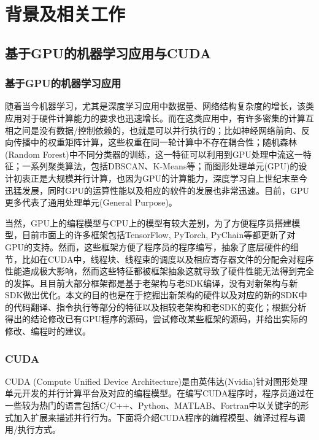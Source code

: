 \section{背景及相关工作}

\subsection{基于GPU的机器学习应用与CUDA}

\subsubsection{基于GPU的机器学习应用}
\par 随着当今机器学习，尤其是深度学习应用中数据量、网络结构复杂度的增长，该类应用对于硬件计算能力的要求也迅速增长。而在这类应用中，有许多密集的计算互相之间是没有数据/控制依赖的，也就是可以并行执行的；比如神经网络前向、反向传播中的权重矩阵计算，这些权重在同一轮计算中不存在耦合性；随机森林(Random Forest)中不同分类器的训练，这一特征可以利用到GPU处理中流这一特征；一系列聚类算法，包括DBSCAN、K-Means等；而图形处理单元(GPU)的设计初衷正是大规模并行计算，也因为GPU的计算能力，深度学习自上世纪末至今迅猛发展，同时GPU的运算性能以及相应的软件的发展也非常迅速。目前，GPU更多代表了通用处理单元(General Purpose)。
\par 当然，GPU上的编程模型与CPU上的模型有较大差别，为了方便程序员搭建模型，目前市面上的许多框架包括TensorFlow, PyTorch, PyChain等都更新了对GPU的支持。然而，这些框架方便了程序员的程序编写，抽象了底层硬件的细节，比如在CUDA中，线程块、线程束的调度以及相应寄存器文件的分配会对程序性能造成极大影响，然而这些特征都被框架抽象这就导致了硬件性能无法得到完全的发挥。且目前大部分框架都是基于老架构与老SDK编译，没有对新架构与新SDK做出优化。本文的目的也是在于挖掘出新架构的硬件以及对应的新的SDK中的代码翻译、指令执行等部分的特征以及相较老架构和老SDK的变化；根据分析得出的结论修改已有GPU程序的源码，尝试修改某些框架的源码，并给出实际的修改、编程时的建议。
\subsubsection{CUDA}
\par CUDA (Compute Unified Device Architecture)是由英伟达(Nvidia)针对图形处理单元开发的并行计算平台及对应的编程模型。在编写CUDA程序时，程序员通过在一些较为热门的语言包括C/C++、Python、MATLAB、Fortran中以关键字的形式加入扩展来描述并行行为\parencite{CUDAZONE}。下面将介绍CUDA程序的编程模型、编译过程与调用/执行方式。
